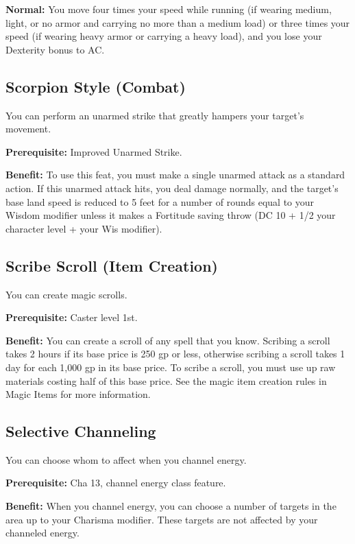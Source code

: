 \textbf{Normal:} You move four times your speed while running (if wearing medium, light, or no armor and carrying no more than a medium load) or three times your speed (if wearing heavy armor or carrying a heavy load), and you lose your Dexterity bonus to AC.
				
\subsection{Scorpion Style (Combat)}

				
You can perform an unarmed strike that greatly hampers your target's movement.
				
\textbf{Prerequisite:} Improved Unarmed Strike.
				
\textbf{Benefit:} To use this feat, you must make a single unarmed attack as a standard action. If this unarmed attack hits, you deal damage normally, and the target's base land speed is reduced to 5 feet for a number of rounds equal to your Wisdom modifier unless it makes a Fortitude saving throw (DC 10 + 1/2 your character level + your Wis modifier).
				
\subsection{Scribe Scroll (Item Creation)}

				
You can create magic scrolls.
				
\textbf{Prerequisite:} Caster level 1st.
				
\textbf{Benefit:} You can create a scroll of any spell that you know. Scribing a scroll takes 2 hours if its base price is 250 gp or less, otherwise scribing a scroll takes 1 day for each 1,000 gp in its base price. To scribe a scroll, you must use up raw materials costing half of this base price. See the magic item creation rules in Magic Items for more information.
				
\subsection{Selective Channeling}

				
You can choose whom to affect when you channel energy.
				
\textbf{Prerequisite:} Cha 13, channel energy class feature.
				
\textbf{Benefit:} When you channel energy, you can choose a number of targets in the area up to your Charisma modifier. These targets are not affected by your channeled energy.
				
